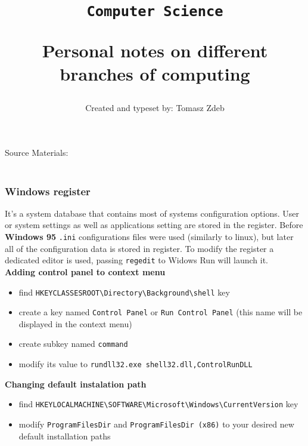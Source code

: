 \documentclass[11pt,a4paper]{article}
\date{\vspace{-3em}}
\title{\vspace{-2em}\texttt{Computer Science} \begin{large} Personal notes on different branches of computing\end{large}\vspace{-0.5em}}
\author{Created and typeset by: Tomasz Zdeb}
\def\bs{\textbackslash}
\def\us{\textunderscore}
\def\source_space{\vspace{0.2em}}
\newcommand{\myline}[2]{\noindent\makebox[\linewidth]{\rule{#1cm}{#2pt}}}
\begin{document}
\maketitle
\myline{16}{1}

\begin{scriptsize}
Source Materials:\\
\source_space\\
\end{scriptsize}

\myline{16}{1}


\subsubsection{Windows register}
It's a system database that contains most of systems configuration options. User or system settings as well as applications setting are stored in the register. Before \textbf{Windows 95} \texttt{.ini} configurations files were used (similarly to linux), but later all of the configuration data is stored in register. To modify the register a dedicated editor is used, passing \texttt{regedit} to Widows Run will launch it.\\

\textbf{Adding control panel to context menu}
\begin{itemize}
\item find \texttt{HKEY{\us}CLASSES{\us}ROOT{\bs}Directory{\bs}Background{\bs}shell} key
\item create a key named \texttt{Control Panel} or \texttt{Run Control Panel} (this name will be displayed in the context menu)
\item create subkey named \texttt{command}
\item modify its value to \texttt{rundll32.exe shell32.dll,Control{\us}RunDLL}
\end{itemize}

\textbf{Changing default instalation path}

\begin{itemize}
\item find \texttt{HKEY{\us}LOCAL{\us}MACHINE{\bs}SOFTWARE{\bs}Microsoft{\bs}Windows{\bs}CurrentVersion} key
\item modify \texttt{ProgramFilesDir} and \texttt{ProgramFilesDir (x86)} to your desired new default installation paths
\end{itemize}
\end{document}
